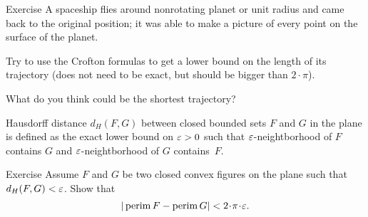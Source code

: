 \begin{thm}{Exercise}
A spaceship flies around nonrotating planet or unit radius and came back to the original position;
it was able to make a picture of every point on the surface of the planet.

Try to use the Crofton formulas to get a lower bound on the length of its trajectory (does not need to be exact, but should be bigger than $2\cdot\pi$).

What do you think could be the shortest trajectory?
\end{thm}

Hausdorff distance $d_H(F,G)$ between closed bounded sets $F$ and $G$ in the plane is defined as the exact lower bound on $\varepsilon>0$ such that $\varepsilon$-neightborhood of $F$ contains $G$ and $\varepsilon$-neightborhood of $G$ contains~$F$.

\begin{thm}{Exercise}
Assume $F$ and $G$ be two closed convex figures on the plane such that $d_H(F,G)<\varepsilon$.
Show that 
\[|\perim F-\perim G|<2\cdot\pi\cdot\eps.\]

\end{thm}